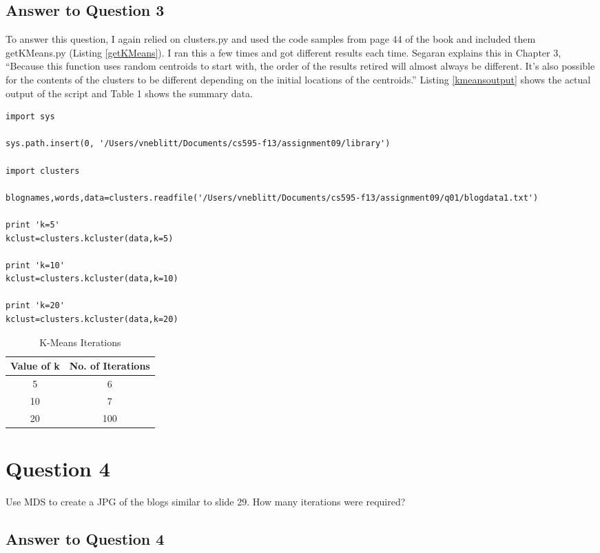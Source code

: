 \documentclass{article}
\begin{document}
\subsection*{Answer to Question 3}

To answer this question, I again relied on clusters.py and used the code samples from page 44 of the book \cite{pci} and included them getKMeans.py (Listing \ref{getKMeans}). I ran this a few times and got different results each time. Segaran explains this in Chapter 3, ``Because this function uses random centroids to start with, the order of the results retired will almost always be different. It's also possible for the contents of the clusters to be different depending on the initial locations of the centroids.''\cite{pci} Listing \ref{kmeansoutput} shows the actual output of the script and Table 1 shows the summary data.

\begin{lstlisting}[frame=single, caption=getKMeans.py, label=getKMeans]
import sys

sys.path.insert(0, '/Users/vneblitt/Documents/cs595-f13/assignment09/library')

import clusters

blognames,words,data=clusters.readfile('/Users/vneblitt/Documents/cs595-f13/assignment09/q01/blogdata1.txt')

print 'k=5'
kclust=clusters.kcluster(data,k=5)

print 'k=10'
kclust=clusters.kcluster(data,k=10)

print 'k=20'
kclust=clusters.kcluster(data,k=20)
\end{lstlisting}

\begin{table}[!h]
\centering
\begin{tabular}{c c}
Value of k & No. of Iterations \\
\hline
5 & 6  \\
10 & 7  \\
20 & 100  \\
\hline
\end{tabular}
\caption{K-Means Iterations}
\end{table}

\newpage
\section*{Question 4}
Use MDS to create a JPG of the blogs similar to slide 29. How many iterations were required?

\subsection*{Answer to Question 4}
\end{document}
